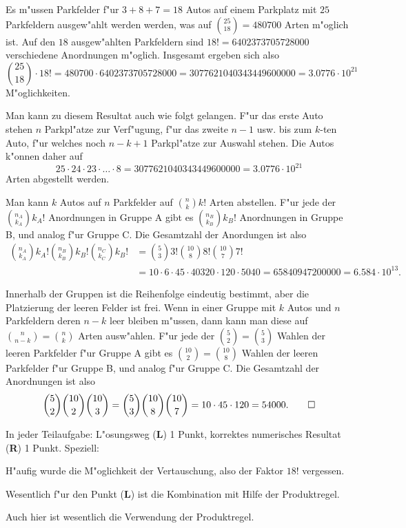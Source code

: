 \begin{loesung}
\begin{teilaufgaben}
\item Es m"ussen Parkfelder f"ur $3 + 8 + 7 = 18$ Autos auf einem
Parkplatz mit $25$ Parkfeldern ausgew"ahlt werden
werden, was auf $\binom{25}{18}=480700$ Arten m"oglich ist.
Auf den $18$ ausgew"ahlten Parkfeldern sind $18!=6402373705728000$
verschiedene Anordnungen m"oglich.
Insgesamt ergeben sich also
\[
\binom{25}{18}\cdot 18!=480700 \cdot 6402373705728000=3077621040343449600000
=3.0776\cdot10^{21}
\]
M"oglichkeiten.

Man kann zu diesem Resultat auch wie folgt gelangen.
F"ur das erste Auto stehen $n$ Parkpl"atze zur Verf"ugung, f"ur das zweite
$n-1$ usw. bis zum $k$-ten Auto, f"ur welches noch $n-k+1$ Parkpl"atze
zur Auswahl stehen. Die Autos k"onnen daher auf
\[
25\cdot
24\cdot
23\cdot
\dots
\cdot
8
=
3077621040343449600000
=3.0776\cdot10^{21}
\]
Arten abgestellt werden.
\item Man kann $k$ Autos auf $n$ Parkfelder auf $\binom{n}{k}k!$ Arten
abstellen. F"ur jede der $\binom{n_A}{k_A}k_A!$ Anordnungen in Gruppe A gibt es 
$\binom{n_B}{k_B}k_B!$ Anordnungen in Gruppe B, und analog f"ur Gruppe C.
Die Gesamtzahl der Anordungen ist also
\begin{align*}
\binom{n_A}{k_A}k_A!
\binom{n_B}{k_B}k_B!
\binom{n_C}{k_C}k_B!
&=
\binom{5}{3}3!
\binom{10}{8}8!
\binom{10}{7}7!
\\
&=10\cdot 6\cdot 45\cdot 40320\cdot 120\cdot 5040=65840947200000=6.584\cdot10^{13}.
\end{align*}
\item Innerhalb der Gruppen ist die Reihenfolge eindeutig bestimmt, aber
die Platzierung der leeren Felder ist frei.
Wenn in einer Gruppe mit $k$ Autos und $n$ Parkfeldern deren $n-k$
leer bleiben m"ussen,
dann kann man diese auf $\binom{n}{n-k}=\binom{n}{k}$ Arten ausw"ahlen.
F"ur jede der $\binom{5}{2}=\binom{5}{3}$ Wahlen der leeren Parkfelder
f"ur Gruppe A gibt es $\binom{10}{2}=\binom{10}{8}$ Wahlen der
leeren Parkfelder f"ur Gruppe B, und analog f"ur Gruppe C.
Die Gesamtzahl der Anordnungen ist also
\[
\binom{5}{2}
\binom{10}{2}
\binom{10}{3}
=
\binom{5}{3}
\binom{10}{8}
\binom{10}{7}
=10\cdot 45\cdot 120=54000.
\qedhere
\]
\end{teilaufgaben}
\end{loesung}

\begin{bewertung}
In jeder Teilaufgabe: L"osungsweg ({\bf L}) 1 Punkt, korrektes numerisches
Resultat ({\bf R}) 1 Punkt. Speziell:
\begin{teilaufgaben}
\item H"aufig wurde die M"oglichkeit der Vertauschung, also der Faktor
$18!$ vergessen.
\item Wesentlich f"ur den Punkt ({\bf L}) ist die Kombination mit Hilfe
der Produktregel.
\item Auch hier ist wesentlich die Verwendung der Produktregel.
\end{teilaufgaben}
\end{bewertung}
